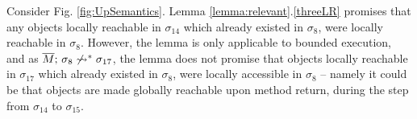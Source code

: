 {Consider Fig.  \ref{fig:UpSemantics}. %
Lemma \ref{lemma:relevant}.\ref{threeLR}  promises that any objects locally reachable in $\sigma_{14}$ which already existed in $\sigma_{8}$, were locally reachable in $\sigma_{8}$. However, the lemma is only  applicable to bounded execution, and as 
$\overline{M};\, {\sigma_8} \not\rightsquigarrow^* \sigma_{17}$, 
the lemma does not promise that  objects locally reachable in $\sigma_{17}$ which already existed in $\sigma_{8}$, were locally accessible in $\sigma_{8}$ -- namely it could be that objects are made globally reachable upon method return, during the step from $\sigma_{14}$ to $\sigma_{15}$.}


